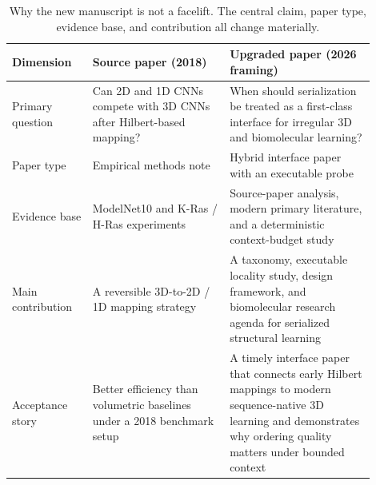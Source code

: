 \begin{table}[t]
\centering
\small
\begin{tabular}{L{0.20\linewidth} L{0.34\linewidth} L{0.36\linewidth}}
\toprule
Dimension & Source paper (2018) & Upgraded paper (2026 framing) \\
\midrule
Primary question & Can 2D and 1D CNNs compete with 3D CNNs after Hilbert-based mapping? & When should serialization be treated as a first-class interface for irregular 3D and biomolecular learning? \\
Paper type & Empirical methods note & Hybrid interface paper with an executable probe \\
Evidence base & ModelNet10 and K-Ras / H-Ras experiments & Source-paper analysis, modern primary literature, and a deterministic context-budget study \\
Main contribution & A reversible 3D-to-2D / 1D mapping strategy & A taxonomy, executable locality study, design framework, and biomolecular research agenda for serialized structural learning \\
Acceptance story & Better efficiency than volumetric baselines under a 2018 benchmark setup & A timely interface paper that connects early Hilbert mappings to modern sequence-native 3D learning and demonstrates why ordering quality matters under bounded context \\
\bottomrule
\end{tabular}
\caption{Why the new manuscript is not a facelift. The central claim, paper type, evidence base, and contribution all change materially.}
\label{tab:source-vs-upgrade}
\end{table}
